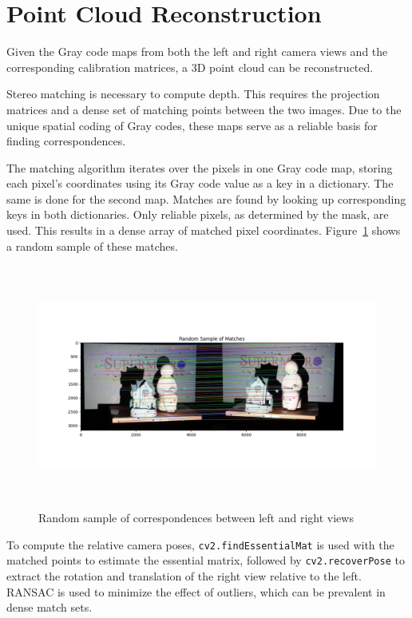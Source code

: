 \documentclass{report}
\begin{document}
\section{Point Cloud Reconstruction}

Given the Gray code maps from both the left and right camera views and the corresponding calibration matrices, a 3D point cloud can be reconstructed.

Stereo matching is necessary to compute depth. This requires the projection matrices and a dense set of matching points between the two images. Due to the unique spatial coding of Gray codes, these maps serve as a reliable basis for finding correspondences.

The matching algorithm iterates over the pixels in one Gray code map, storing each pixel’s coordinates using its Gray code value as a key in a dictionary. The same is done for the second map. Matches are found by looking up corresponding keys in both dictionaries. Only reliable pixels, as determined by the mask, are used. This results in a dense array of matched pixel coordinates. Figure~\ref{fig:match} shows a random sample of these matches.

\begin{figure}[H]
    \centering
    \includegraphics[height=80mm, keepaspectratio]{report_images/3_point_cloud/plotted_matches.png}
    \caption{Random sample of correspondences between left and right views}
    \label{fig:match}
\end{figure}

To compute the relative camera poses, \texttt{cv2.findEssentialMat} is used with the matched points to estimate the essential matrix, followed by \texttt{cv2.recoverPose} to extract the rotation and translation of the right view relative to the left. RANSAC is used to minimize the effect of outliers, which can be prevalent in dense match sets.
\end{document}
